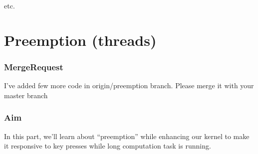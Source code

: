\documentclass[]{book}
\newenvironment{Shaded}{}{}
\newcommand{\KeywordTok}[1]{\textbf{{#1}}}
\newcommand{\NormalTok}[1]{{#1}}
\begin{document}
etc.

\section{Preemption (threads)}\label{preemption-threads}

\subsubsection*{MergeRequest}\label{mergerequest-7}

I've added few more code in origin/preemption branch. Please merge it
with your master branch

\begin{Shaded}
\end{Shaded}

\subsubsection*{Aim}\label{aim-7}

In this part, we'll learn about ``preemption'' while enhancing our
kernel to make it responsive to key presses while long computation task
is running.
\end{document}
